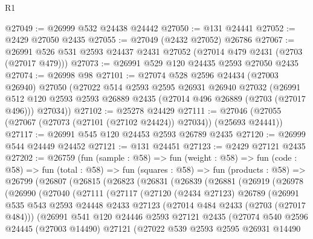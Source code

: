 \begin{lexlean}{R1}
\begin{coremodule}
@27049 := @26999 @532 @24438 @24442
@27050 := @131 @24441
@27052 := @2429 @27050 @2435
@27055 := @27049 (@2432 @27052) @26786
@27067 := @26991 @526 @531 @2593 @24437 @2431 @27052 (@27014 @479 @2431 (@2703 (@27017 @479)))
@27073 := @26991 @529 @120 @24435 @2593 @27050 @2435
@27074 := @26998 @98
@27101 := @27074
    @528
    @2596
    @24434
    (@27003 @26940)
    @27050
    (@27022
      @514
      @2593
      @2595
      @26931
      @26940
      @27032
      (@26991 @512 @120 @2593 @2593 @26889 @2435 (@27014 @496 @26889 (@2703 (@27017 @496))) @27034))
@27102 := @25278 @24429
@27111 := @27046 (@27055 (@27067 (@27073 (@27101 (@27102 @24424)) @27034)) (@25693 @24441))
@27117 := @26991 @545 @120 @24453 @2593 @26789 @2435
@27120 := @26999 @544 @24449 @24452
@27121 := @131 @24451
@27123 := @2429 @27121 @2435
@27202 := @26759
    (fun (sample : @58) =>
    fun (weight : @58) =>
    fun (code : @58) =>
    fun (total : @58) =>
    fun (squares : @58) =>
    fun (products : @58) =>
    @26799
      (@26807
        (@26815
          (@26823
            (@26831
              (@26839
                (@26881
                  (@26919
                    (@26978
                      (@26990
                        (@27040
                          (@27111
                            (@27117
                              (@27120
                                (@2434 @27123)
                                @26789
                                (@26991
                                  @535
                                  @543
                                  @2593
                                  @24448
                                  @2433
                                  @27123
                                  (@27014 @484 @2433 (@2703 (@27017 @484)))
                                  (@26991
                                    @541
                                    @120
                                    @24446
                                    @2593
                                    @27121
                                    @2435
                                    (@27074
                                      @540
                                      @2596
                                      @24445
                                      (@27003 @14490)
                                      @27121
                                      (@27022
                                        @539
                                        @2593
                                        @2595
                                        @26931
                                        @14490

\end{coremodule}
\end{lexlean}
